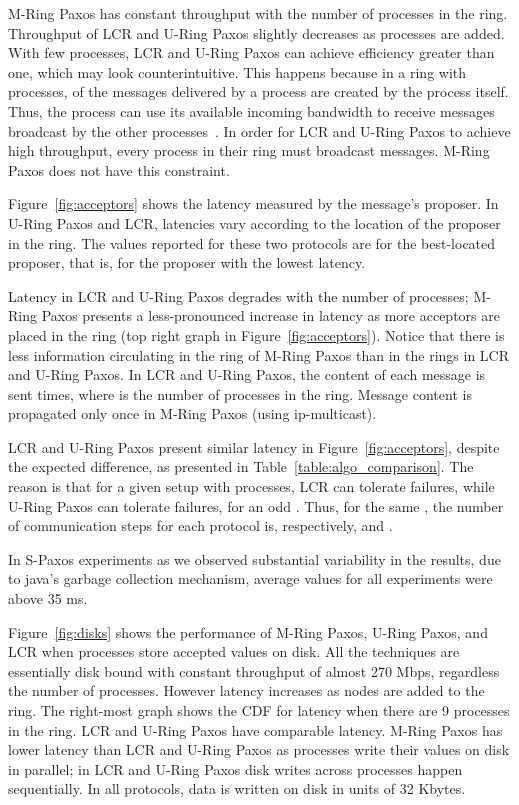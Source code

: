 \documentclass[final,3p,times,twocolumn,authoryear]{elsarticle}
\begin{document}
M-Ring Paxos has constant throughput with the number of processes in the ring. Throughput of LCR and U-Ring Paxos slightly decreases as processes are added. With few processes, LCR and U-Ring Paxos can achieve efficiency greater than one, which may look counterintuitive. This happens because in a ring with  processes,  of the messages delivered by a process are created by the process itself. Thus, the process can use its available incoming bandwidth to receive messages broadcast by the other processes~\cite{Guerraoui2010}.
In order for LCR and U-Ring Paxos to achieve high throughput, every process in their ring must broadcast messages. 
M-Ring Paxos does not have this constraint.

Figure~\ref{fig:acceptors} shows the latency measured by the message's proposer. 
In U-Ring Paxos and LCR, latencies vary according to the location of the proposer in the ring. 
The values reported for these two protocols are for the best-located proposer, that is, for the proposer with the lowest latency. 

Latency in LCR and U-Ring Paxos degrades with the number of processes; M-Ring Paxos presents a less-pronounced increase in latency as more acceptors are placed in the ring (top right graph in Figure~\ref{fig:acceptors}). Notice that there is less information circulating in the ring of M-Ring Paxos than in the rings in LCR and U-Ring Paxos. In LCR and U-Ring Paxos, the content of each message is sent  times, where  is the number of processes in the ring. Message content is propagated only once in M-Ring Paxos (using ip-multicast). 

LCR and U-Ring Paxos present similar latency in Figure~\ref{fig:acceptors}, despite the expected difference, as presented in Table~\ref{table:algo_comparison}. The reason is that for a given setup with  processes, LCR can tolerate  failures, while U-Ring Paxos can tolerate  failures, for an odd . Thus, for the same , the number of communication steps for each protocol is, respectively,  and .

In S-Paxos experiments as we observed substantial variability in the results, due to java's garbage collection mechanism, average values for all experiments were above 35 ms. 


Figure~\ref{fig:disks} shows the performance of M-Ring Paxos, U-Ring Paxos, and LCR when processes store accepted values on disk. All the techniques are essentially disk bound with constant throughput of almost 270 Mbps, regardless the number of processes. However latency increases as nodes are added to the ring. The right-most graph shows the CDF for latency when there are 9 processes in the ring. 
LCR and U-Ring Paxos have comparable latency. M-Ring Paxos has lower latency than LCR and U-Ring Paxos as processes write their values on disk in parallel; in LCR and U-Ring Paxos disk writes across processes happen sequentially. 
In all protocols, data is written on disk in units of 32 Kbytes.
\end{document}
